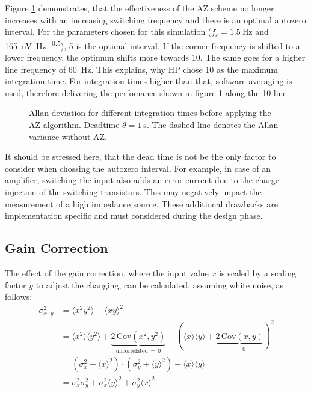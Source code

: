Figure \ref{fig:autozero_deadtime_nplcs_adev} demonstrates, that the effectiveness of the AZ scheme no longer increases with an increasing switching frequency and there is an optimal autozero interval. For the parameters chosen for this simulation ($f_c = \qty{1.5}{\Hz}$ and \qty[power-half-as-sqrt, per-mode=symbol]{165}{\nV \Hz\tothe{-0.5}}), \qty{5}{\plc} is the optimal interval. If the corner frequency is shifted to a lower frequency, the optimum shifts more towards \qty{10}{\plc}. The same goes for a higher line frequency of \qty{60}{\Hz}. This explains, why HP chose \qty{10}{\plc} as the maximum integration time. For integration times higher than that, software averaging is used, therefore delivering the perfomance shown in figure \ref{fig:autozero_deadtime_nplcs_adev} along the \qty{10}{\plc} line.

\begin{figure}[ht]
    \centering
    
    \caption{Allan deviation for different integration times before applying the AZ algorithm. Deadtime $\theta = \qty{1}{\s}$. The dashed line denotes the Allan variance without AZ.}
    \label{fig:autozero_deadtime_nplcs_adev}
\end{figure}

It should be stressed here, that the dead time is not be the only factor to consider when chossing the autozero interval. For example, in case of an amplifier, switching the input also adds an error current due to the charge injection of the switching transistors. This may negatively impact the measurement of a high impedance source. These additional drawbacks are implementation specific and must considered during the design phase.

\clearpage
\subsection{Gain Correction}
\label{sec:autozero_gain}
The effect of the gain correction, where the input value $x$ is scaled by a scaling factor $y$ to adjust the changing, can be calculated, assuming white noise, as follows:
\begin{align}
    \sigma_{x \cdot y}^2 &= \langle x^2 y^2 \rangle - \langle x y \rangle^2 \nonumber\\
    &= \langle x^2 \rangle \langle y^2 \rangle + \underbrace{2\,\mathrm{Cov}\left(x^2,y^2\right)}_{\text{uncorrelated} \, = \, 0} - \left( \langle x \rangle \langle y \rangle + \underbrace{2\,\mathrm{Cov}\left(x,y\right)}_{=\, 0} \right)^2 \nonumber\\
    &= \left(\sigma_x^2 + \langle x \rangle^2\right) \cdot \left(\sigma_y^2 + \langle y \rangle^2\right) - \langle x \rangle \langle y \rangle \nonumber\\
    &= \sigma_x^2 \sigma_y^2 + \sigma_x^2 \langle y \rangle^2 + \sigma_y^2 \langle x \rangle^2 \label{eqn:variance_multiplied}\\
\end{align}

